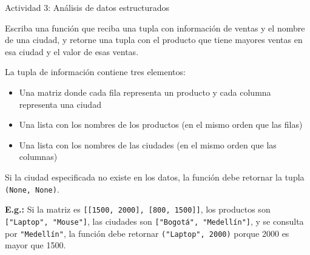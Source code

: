 \documentclass{ip-lab}
\begin{document}
\begin{sectionbox}{Actividad 3: Análisis de datos estructurados}

Escriba una función que reciba una tupla con información de ventas y el nombre de una ciudad, y retorne una tupla con el producto que tiene mayores ventas en esa ciudad y el valor de esas ventas.

La tupla de información contiene tres elementos:
\begin{itemize}
    \item Una matriz donde cada fila representa un producto y cada columna representa una ciudad
    \item Una lista con los nombres de los productos (en el mismo orden que las filas)
    \item Una lista con los nombres de las ciudades (en el mismo orden que las columnas)
\end{itemize}

Si la ciudad especificada no existe en los datos, la función debe retornar la tupla \texttt{(None, None)}.

\textbf{E.g.:} Si la matriz es \texttt{[[1500, 2000], [800, 1500]]}, los productos son \texttt{["Laptop", "Mouse"]}, las ciudades son \texttt{["Bogotá", "Medellín"]}, y se consulta por \texttt{"Medellín"}, la función debe retornar \texttt{("Laptop", 2000)} porque 2000 es mayor que 1500.

\end{sectionbox}

\pagebreak
\end{document}
